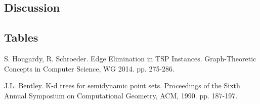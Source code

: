 \documentclass{article} \usepackage[left=2cm,top=1.5cm,right=2cm,
\DeclareRobustCommand\{{\ifmmode\lbrace\else\textbraceleft\fi}
\DeclareRobustCommand\}{\ifmmode\rbrace\else\textbraceright\fi}
\begin{document}
\subsection{Discussion}

\subsection{Tables}

\begin{thebibliography}{99}
 S. Hougardy, R. Schroeder. Edge Elimination in TSP
  Instances. Graph-Theoretic Concepts in Computer Science, WG
  2014. pp. 275-286.

 J.L. Bentley. K-d trees for semidynamic point
  sets. Proceedings of the Sixth Annual Symposium on Computational
  Geometry, ACM, 1990. pp. 187-197. 
\end{thebibliography}
\end{document}
